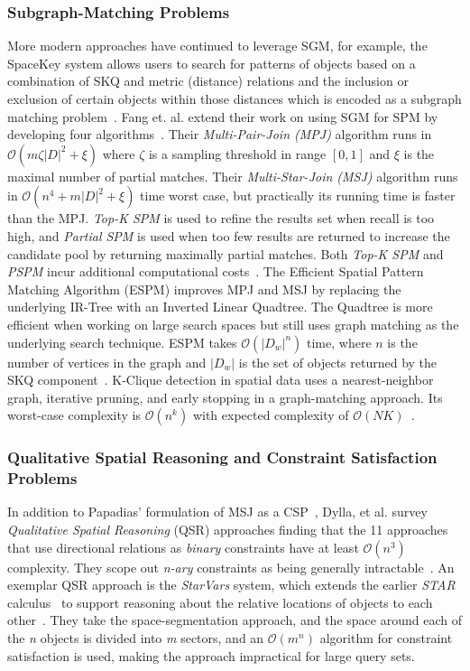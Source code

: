 \subsubsection{Subgraph-Matching Problems}
\par{
    More modern approaches have continued to leverage SGM, for example, the SpaceKey system allows users to search for patterns of objects based on a combination of SKQ and metric (distance) relations and the inclusion or exclusion of certain objects within those distances which is encoded as a subgraph matching problem~\cite{Fang2018}.
    Fang et. al. extend their work on using SGM for SPM by developing four algorithms~\cite{Fang2019}. 
    Their \textit{Multi-Pair-Join (MPJ)} algorithm runs in $\mathcal{O}(m\zeta |D|^2+\xi)$ where $\zeta$ is a sampling threshold in range $[0,1]$ and $\xi$ is the maximal number of partial matches. 
    Their \textit{Multi-Star-Join (MSJ)} algorithm runs in $\mathcal{O}(n^4+m|D|^2+\xi)$ time worst case, but practically its running time is faster than the MPJ. 
    \textit{Top-K SPM} is used to refine the results set when recall is too high, and \textit{Partial SPM} is used when too few results are returned to increase the candidate pool by returning maximally partial matches. 
    Both \textit{Top-K SPM} and \textit{PSPM} incur additional computational costs~\cite{Fang2019}.
    The Efficient Spatial Pattern Matching Algorithm (ESPM) improves MPJ and MSJ by replacing the underlying IR-Tree with an Inverted Linear Quadtree. 
    The Quadtree is more efficient when working on large search spaces but still uses graph matching as the underlying search technique. 
    ESPM takes $\mathcal{O}(|D_w|^n)$ time, where $n$ is the number of vertices in the graph and $|D_w|$ is the set of objects returned by the SKQ component~\cite{Chen2019}. 
    K-Clique detection in spatial data uses a nearest-neighbor graph, iterative pruning, and early stopping in a graph-matching approach. 
    Its worst-case complexity is $\mathcal{O}(n^k)$ with expected complexity of $\mathcal{O}(NK)$~\cite{Taniguchi2022}.
    }  

\subsubsection{Qualitative Spatial Reasoning and Constraint Satisfaction Problems}
    \par{
    In addition to Papadias' formulation of MSJ as a CSP~\cite{Papadias1998}, Dylla, et al. survey \textit{Qualitative Spatial Reasoning} (QSR) approaches finding that the 11 approaches that use directional relations as \textit{binary} constraints have at least $\mathcal{O}(n^3)$ complexity. 
    They scope out \textit{n-ary} constraints as being generally intractable~\cite{Dylla2017}. 
    An exemplar QSR approach is the \textit{StarVars} system, which extends the earlier \textit{STAR} calculus~\cite{Renz2004} to support reasoning about the relative locations of objects to each other~\cite{Lee2013}.
    They take the space-segmentation approach, and the space around each of the \textit{n} objects is divided into \textit{m} sectors, and an $\mathcal{O}(m^n)$ algorithm for constraint satisfaction is used, making the approach impractical for large query sets.}
    

